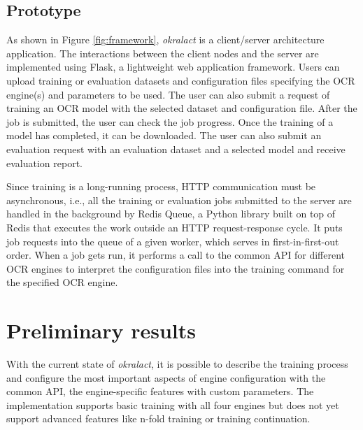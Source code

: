 \documentclass[conference]{IEEEtran}
\begin{document}
\subsection{Prototype}
\label{sec:prototype}

As shown in Figure \ref{fig:framework}, \textit{okralact} is a client/server
architecture application. The interactions between the client nodes and the
server are implemented using Flask, a lightweight web application framework.
Users can upload training or evaluation datasets and configuration files
specifying the OCR engine(s) and parameters to be used. The user
can also submit a request of training an OCR model with the selected
dataset and configuration file. After the job is submitted, the
user can check the job progress. Once the training of a model has
completed, it can be downloaded. The user can also submit an
evaluation request with an evaluation dataset and a selected model
and receive evaluation report.



Since training is a long-running process, HTTP communication must be asynchronous,
i.e., all the training or evaluation
jobs submitted to the server are handled in the background by Redis Queue,
a Python library built on top of Redis that
executes the work outside an HTTP request-response cycle. It puts job
requests into the queue of a given worker, which serves in
first-in-first-out order. When a job gets run, it performs a call to the common
API for different OCR engines to interpret the configuration files into the
training command for the specified OCR engine.




\section{Preliminary results}

With the current state of \textit{okralact}, it is possible to describe the training process
and  configure the most important aspects of engine configuration with the common API, the 
engine-specific features with custom parameters. The implementation supports basic
training with all four engines but does not yet support advanced features like
n-fold training or training continuation.
\end{document}
